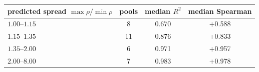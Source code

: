 \begin{tabular}{lccc}
\toprule
predicted spread $\max\rho/\min\rho$ & pools & median $R^2$ & median Spearman \\
\midrule
$1.00$--$1.15$ & 8 & 0.670 & +0.588 \\
$1.15$--$1.35$ & 11 & 0.876 & +0.833 \\
$1.35$--$2.00$ & 6 & 0.971 & +0.957 \\
$2.00$--$8.00$ & 7 & 0.983 & +0.978 \\
\bottomrule
\end{tabular}